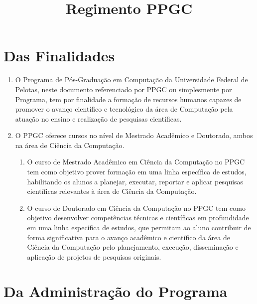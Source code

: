 \documentclass{article}
\title{Regimento PPGC}
\begin{document}
\maketitle

\section{Das Finalidades}

\begin{enumerate}
\item O Programa de Pós-Graduação em Computação da Universidade Federal de Pelotas, neste documento referenciado por PPGC ou simplesmente por Programa, tem por finalidade a formação de recursos humanos capazes de promover o avanço científico e tecnológico da área de Computação pela atuação no ensino e realização de pesquisas científicas.

\item O PPGC oferece cursos no nível de Mestrado Acadêmico e Doutorado, ambos na área de Ciência da Computação.
\begin{enumerate}
	\item O curso de Mestrado Acadêmico em Ciência da Computação no PPGC tem como objetivo prover formação em uma linha específica de estudos, habilitando os alunos a planejar, executar, reportar e aplicar pesquisas científicas relevantes à área de Ciência da Computação.

	\item O curso de Doutorado em Ciência da Computação no PPGC tem como objetivo desenvolver competências técnicas e científicas em profundidade em uma linha específica de estudos, que permitam ao aluno contribuir de forma significativa para o avanço acadêmico e científico da área de Ciência da Computação pelo planejamento, execução, disseminação e aplicação de projetos de pesquisas originais.

\end{enumerate}

\end{enumerate}

\section{Da Administração do Programa}
\end{document}
